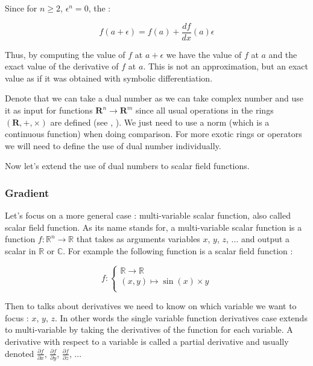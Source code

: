 \documentclass[12pt]{article}
\begin{document}
Since for $n \geq 2$, $\epsilon^n = 0$, the :

$$
f(a+\epsilon) = f(a) + \frac{df}{dx}(a) \epsilon
$$

Thus, by computing the value of $f$ at $a+\epsilon$ we have the value of $f$ at $a$ and the exact value of the derivative of $f$ at $a$. This is not an approximation, but an exact value as if it was obtained with symbolic differentiation.

Denote that we can take a dual number as we can take complex number and use it as input for functions $\mathbf{R}^n \rightarrow \mathbf{R}^m$ since all usual operations in the rings $(\mathbf{R},+, \times)$ are defined (see \cite{stackexchange_dual_number_for_scalar_functions}, \cite{pdf_analysis_dual_functions}). We just need to use a norm (which is a continuous function) when doing comparison.
For more exotic rings or operators we will need to define the use of dual number individually.

\bigskip 

Now let's extend the use of dual numbers to scalar field functions.

\subsubsection{Gradient}

Let's focus on a more general case : multi-variable scalar function, also called scalar field function. As its name stands for, a multi-variable scalar function is a function $f : \mathbb{R}^n \rightarrow \mathbb{R}$ that takes as arguments variables $x$, $y$, $z$, ... and output a scalar in $\mathbb{R}$ or $\mathbb{C}$. For example the following function is a scalar field function :

$$
f : 
\begin{cases}
\mathbb{R} \rightarrow \mathbb{R} \\
(x, y) \mapsto \sin(x) \times y \\
\end{cases}
$$

Then to talks about derivatives we need to know on which variable we want to focus : $x$, $y$, $z$. In other words the single variable function derivatives case extends to multi-variable by taking the derivatives of the function for each variable. A derivative with respect to a variable is called a partial derivative \cite{wiki_partial_derivative} and usually denoted $\frac{\partial{f}}{\partial{x}}$, $\frac{\partial{f}}{\partial{y}}$, $\frac{\partial{f}}{\partial{z}}$, ...
\end{document}
